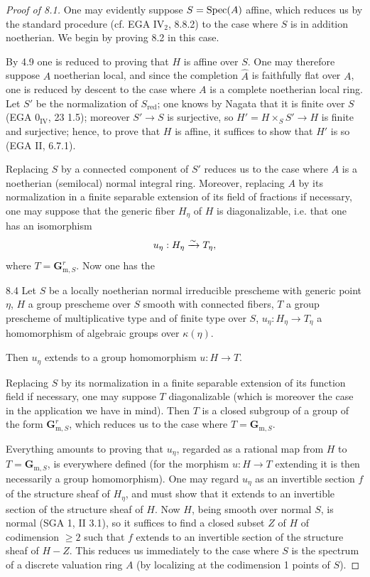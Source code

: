 \begin{proof}[Proof of 8.1]
One may evidently suppose $S=\operatorname{Spec}(A)$ affine, which reduces us by the standard procedure (cf. EGA IV$_2$, 8.8.2) to the case where $S$ is in addition noetherian. We begin by proving 8.2 in this case.

By 4.9 one is reduced to proving that $H$ is affine over $S$. One may therefore suppose $A$ noetherian local, and since the completion $\widehat A$ is faithfully flat over $A$, one is reduced by descent to the case where $A$ is a complete noetherian local ring. Let $S'$ be the normalization of $S_{\mathrm{red}}$; one knows by Nagata that it is finite over $S$ (EGA $0_{\mathrm{IV}}$, 23 1.5); moreover $S'\to S$ is surjective, so $H'=H\times_S S'\to H$ is finite and surjective; hence, to prove that $H$ is affine, it suffices to show that $H'$ is so (EGA II, 6.7.1).

 Replacing $S$ by a connected component of $S'$ reduces us to the case where $A$ is a noetherian (semilocal) normal integral ring. Moreover, replacing $A$ by its normalization in a finite separable extension of its field of fractions if necessary, one may suppose that the generic fiber $H_\eta$ of $H$ is diagonalizable, i.e. that one has an isomorphism
\[
u_\eta:H_\eta\xrightarrow{\sim} T_\eta,
\]
where $T=\mathbf{G}_{\mathrm{m},S}^r$. Now one has the
\begin{lemma}{8.4}\label{X.8.4}
Let $S$ be a locally noetherian normal irreducible prescheme with generic point $\eta$, $H$ a group prescheme over $S$ smooth with connected fibers, $T$ a group prescheme of multiplicative type and of finite type over $S$, $u_\eta:H_\eta\to T_\eta$ a homomorphism of algebraic groups over $\kappa(\eta)$.

Then $u_\eta$ extends to a group homomorphism $u:H\to T$.
\end{lemma}
Replacing $S$ by its normalization in a finite separable extension of its function field if necessary, one may suppose $T$ diagonalizable (which is moreover the case in the application we have in mind). Then $T$ is a closed subgroup of a group of the form $\mathbf{G}_{\mathrm{m},S}^r$, which reduces us to the case where $T=\mathbf{G}_{\mathrm{m},S}$.

Everything amounts to proving that $u_\eta$, regarded as a rational map from $H$ to $T=\mathbf{G}_{\mathrm{m},S}$, is everywhere defined (for the morphism $u:H\to T$ extending it is then necessarily a group homomorphism). One may regard $u_\eta$ as an invertible section $f$ of the structure sheaf of $H_\eta$, and must show that it extends to an invertible section of the structure sheaf of $H$. Now $H$, being smooth over normal $S$, is normal (SGA 1, II 3.1), so it suffices to find a closed subset $Z$ of $H$ of codimension $\geq2$ such that $f$ extends to an invertible section of the structure sheaf of $H-Z$. This reduces us immediately to the case where $S$ is the spectrum of a discrete valuation ring $A$ (by localizing at the codimension 1 points of $S$).


\end{proof}
